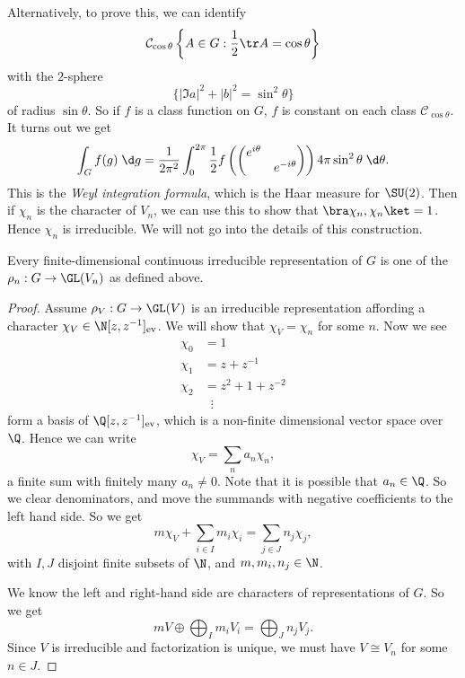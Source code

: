 \documentclass[a4paper]{article}
\begin{document}
Alternatively, to prove this, we can identify
\[
  \mathcal{C}_{\cos \theta} \left\{A \in G: \frac{1}{2}\tr A = \cos \theta \right\}
\]
with the $2$-sphere
\[
  \{ |\Im a|^2 + |b|^2 = \sin^2 \theta\}
\]
of radius $\sin \theta$. So if $f$ is a class function on $G$, $f$ is constant on each class $\mathcal{C}_{\cos \theta}$. It turns out we get
\[
  \int_G f(g)\;\d g = \frac{1}{2\pi^2}\int_0^{2\pi} \frac{1}{2}f\left(
  \begin{pmatrix}
    e^{i\theta}\\
    &e^{-i\theta}
  \end{pmatrix}\right) 4\pi \sin^2 \theta\;\d \theta.
\]
This is the \emph{Weyl integration formula}, which is the Haar measure for $\SU(2)$. Then if $\chi_n$ is the character of $V_n$, we can use this to show that $\bra \chi_n, \chi_n\ket = 1$. Hence $\chi_n$ is irreducible. We will not go into the details of this construction.

\begin{thm}
  Every finite-dimensional continuous irreducible representation of $G$ is one of the $\rho_n: G \to \GL(V_n)$ as defined above.
\end{thm}

\begin{proof}
  Assume $\rho_V: G \to \GL(V)$ is an irreducible representation affording a character $\chi_V \in \N[z, z^{-1}]_{\mathrm{ev}}$. We will show that $\chi_V = \chi_n$ for some $n$. Now we see
  \begin{align*}
    \chi_0 &= 1\\
    \chi_1 &= z + z^{-1}\\
    \chi_2 &= z^2 +1 + z^{-2}\\
    &\;\;\vdots
  \end{align*}
  form a basis of $\Q[z, z^{-1}]_{\mathrm{ev}}$, which is a non-finite dimensional vector space over $\Q$. Hence we can write
  \[
    \chi_V = \sum_n a_n \chi_n,
  \]
  a finite sum with finitely many $a_n\not= 0$. Note that it is possible that $a_n \in \Q$. So we clear denominators, and move the summands with negative coefficients to the left hand side. So we get
  \[
    m \chi_V + \sum_{i \in I} m_i \chi_i = \sum_{j \in J} n_j \chi_j,
  \]
  with $I, J$ disjoint finite subsets of $\N$, and $m, m_i, n_j \in \N$.

  We know the left and right-hand side are characters of representations of $G$. So we get
  \[
    m V \oplus \bigoplus_I m_i V_i = \bigoplus_J n_j V_j.
  \]
  Since $V$ is irreducible and factorization is unique, we must have $V \cong V_n$ for some $n \in J$.
\end{proof}
\end{document}

